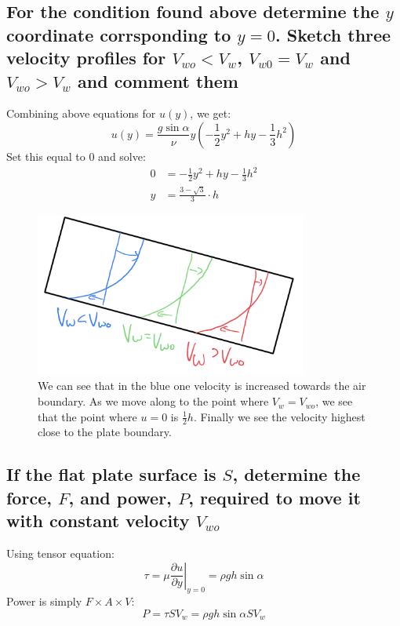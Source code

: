 \documentclass[class=report, crop=false, 12pt,a4paper]{standalone}
\begin{document}
\subsection{For the condition found above determine the $y$ coordinate corrsponding to $y=0$. Sketch three velocity profiles for $V_{wo} < V_w $, $V_{w0} = V_w$ and $V_{wo} > V_w$ and comment them}
Combining above equations for $u(y)$, we get:
\begin{equation}
  u(y) = \frac{g\sin{\alpha}}{\nu}y\left(-\frac{1}{2}y^2 + hy - \frac{1}{3}h^2\right)
\end{equation}
Set this equal to 0 and solve:
\begin{align}
  0 &= -\frac{1}{2}y^2 + hy - \frac{1}{3}h^2\\
  y &= \frac{3-\sqrt{3}}{3}\cdot h
\end{align}
\begin{figure}[H]
  \centering
  \includegraphics[width = 0.8\textwidth]{../img/velocityprofile004001.png}
  \caption{We can see that in the blue one velocity is increased towards the air boundary. As we move along to the point where $V_w = V_{wo}$, we see that the point where $u=0$ is $\frac{1}{2}h$. Finally we see the velocity highest close to the plate boundary.}
\end{figure}
\subsection{If the flat plate surface is $S$, determine the force, $F$, and power, $P$, required to move it with constant velocity $V_{wo}$}
Using tensor equation:
\begin{equation}
  \tau = \left. \mu \frac{\partial u}{\partial y}\right|_{y=0} = \rho g h \sin{\alpha}
\end{equation}
Power is simply $F \times A \times V$:
\begin{equation}
  P = \tau SV_w = \rho g h \sin{\alpha} SV_w
\end{equation}
\end{document}
